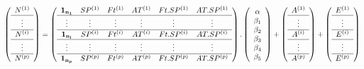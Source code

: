 \documentclass[12pt,fleqn]{book} %
\begin{document}
\begin{equation}
\left (\begin{array}{c}
N^{(1)} \\
\hline
\vdots \\
\hline
N^{(i)} \\
\hline
\vdots \\
\hline
N^{(p)} \\
\end{array}\right) =
\left (\begin{array}{c c c c c c}
 \mathbf{1_{n_1}} & SP^{(1)} & Ft^{(1)} & AT^{(1)} & Ft.SP^{(1)} & AT.SP^{(1)} \\
\hline
\vdots & \vdots & \vdots & \vdots & \vdots & \vdots  \\
\hline
 \mathbf{1_{n_i}} & SP^{(i)} & Ft^{(i)} & AT^{(i)} & Ft.SP^{(i)} & AT.SP^{(i)} \\
\hline
\vdots & \vdots & \vdots & \vdots & \vdots & \vdots  \\
\hline
 \mathbf{1_{n_p}} & SP^{(p)} & Ft^{(p)} & AT^{(p)} & Ft.SP^{(p)} & AT.SP^{(p)}\\
\end{array}\right) .
\left (\begin{array}{c}
\alpha\\
\beta_1 \\
\beta_2 \\
\beta_3 \\
\beta_4 \\
\beta_5 \\
\end{array}\right) +
\left (\begin{array}{c}
 A^{(1)}\\
\hline
\vdots \\
\hline
A^{(i)}\\
\hline
\vdots \\
\hline
A^{(p)}\\

\end{array}\right) +
\left (\begin{array}{c}
 E^{(1)}\\
\hline
\vdots \\
\hline
 E^{(i)}\\
\hline
\vdots \\
\hline
 E^{(p)}\\
\end{array}\right)
\end{equation}

\vspace{1em}
\end{document}

